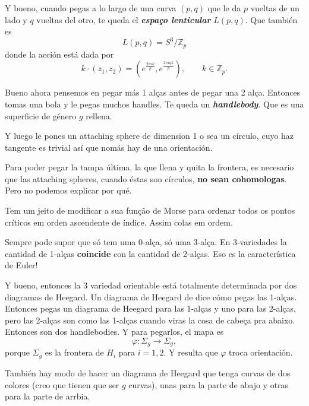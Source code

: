 Y bueno, cuando pegas a lo largo de una curva \((p,q)\) que le da \(p\) vueltas de un lado y \(q\) vueltas del otro, te queda el \textit{\textbf{espaço lenticular}} \(L(p,q)\). Que  también es
\[L(p,q)=S^3/\mathbb{Z}_p\]
donde la acción está dada por
\[k\cdot (z_1,z_2)=\left(e^{\frac{2\pi i k}{p}},e^{\frac{2\pi iqk}{p}}\right) ,\qquad k \in \mathbb{Z}_p.\]

Bueno ahora pensemos en pegar más 1 alças antes de pegar una 2 alça. Entonces tomas una bola y le pegas muchos handles. Te queda un \textit{\textbf{handlebody}}. Que es una superficie de género \(g\) rellena.

Y luego le pones un attaching sphere de dimension 1 o sea un círculo, cuyo haz tangente es trivial así que nomás hay de una orientación.

\begin{remark}\leavevmode
	Para poder pegar la tampa última, la que llena y quita la frontera, es necesario que las attaching spheres, cuando éstas son círculos, \textbf{no sean cohomologas}. Pero no podemos explicar por qué.
\end{remark}

\begin{remark}\leavevmode
Tem um jeito de modificar a sua função de Morse para ordenar todos os pontos críticos em orden ascendente de índice. Assim colas em ordem. 
\end{remark}

Sempre pode supor que só tem uma 0-alça, só uma 3-alça. En 3-variedades la cantidad de 1-alças \textbf{coincide} con la cantidad de 2-alças. Eso es la característica de Euler!

Y bueno, entonces la 3 variedad orientable está totalmente determinada por dos diagramas de Heegard. Un diagrama de Heegard de dice cómo pegas las 1-alças. Entonces pegas un diagrama de Heegard para las 1-alças y uno para las 2-alças, pero las 2-alças son como las 1-alças cuando viras la cosa de cabeça pra abaixo. Entonces son dos handlebodies. Y para pegarlos, el mapa es 
\[\varphi:\Sigma_g \to \Sigma_g,\]
porque \(\Sigma_g\) es la frontera de \(H_i\) para  \(i=1,2\). Y resulta que  \(\varphi\) troca orientación. 

\begin{remark}\leavevmode
También hay modo de hacer un diagrama de Heegard que tenga curvas de dos colores (creo que tienen que ser \(g\) curvas), unas para la parte de abajo y otras para la parte de arrbia.
\end{remark}



